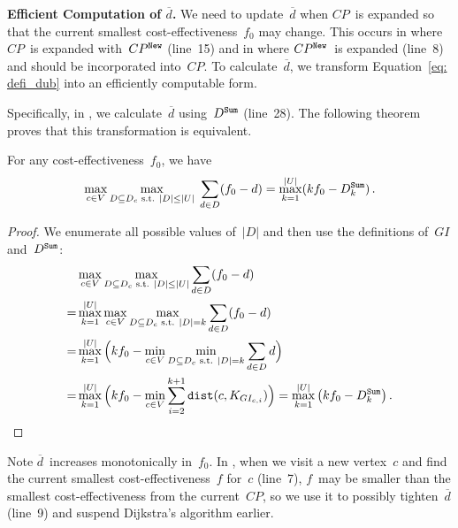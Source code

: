 \textbf{Efficient Computation of $\overline{d}$.}
We need to update~$\overline d$ when $CP$~is expanded so that the current smallest cost-effectiveness~$f_0$ may change. This occurs in \Improved where $CP$~is expanded with~$CP^{\mathtt{New}}$ (line~15) and in \PartialDijkstra where $CP^{\mathtt{New}}$~is expanded (line~8) and should be incorporated into~$CP$. To calculate~$\overline d$, we transform Equation~\eqref{eq: defi_dub} into an efficiently computable form.

Specifically, in \Improved, we calculate~$\overline{d}$ using~$D^{\texttt{Sum}}$ (line~28). The following theorem proves that this transformation is equivalent.

\begin{theorem}
\label{the: msd2dub}
    For any cost-effectiveness~$f_0$, we have
    \begin{gather}
    \label{eq: calc_dub}
        \max_{c\in V}\max_{D \subseteq D_{c} \text{ s.t. } |D|\leq |U|}\; \sum_{d\in D}(f_0-d)=\max_{k=1}^{|U|}(kf_0-D^{\texttt{Sum}}_{k}) \,.
    \end{gather}
\end{theorem}
\begin{proof}
    We enumerate all possible values of~$|D|$ and then use the definitions of~$GI$ and~$D^{\texttt{Sum}}$:
    \begin{gather}
    \label{eq: dub_fin_1}
    \begin{aligned}
    &\max_{c\in V}\max_{D \subseteq D_{c} \text{ s.t. } |D|\leq |U|} \sum_{d\in D}(f_0-d)\\
    =&\max_{k=1}^{|U|}\max_{c\in V}\max_{D \subseteq D_{c}\text{ s.t. } |D|=k} \sum_{d\in D}(f_0-d)\\
    =&\max_{k=1}^{|U|} \Big(kf_0-\min_{c\in V}\min_{D \subseteq D_{c}\text{ s.t. } |D|=k}{\sum_{d\in D}d}\Big)\\
    =&\max_{k=1}^{|U|} \Big(kf_0-\min_{c\in V}\sum_{i=2}^{k+1}\mathtt{dist}(c,K_{GI_{c,i}})\Big)
    =\max_{k=1}^{|U|} \big(kf_0-D^{\texttt{Sum}}_{k}\big) \,.
    \end{aligned}
    \end{gather}
\end{proof}

Note $\overline{d}$~increases monotonically in~$f_0$. In \PartialDijkstra, when we visit a new vertex~$c$ and find the current smallest cost-effectiveness~$f$ for~$c$ (line~7), $f$~may be smaller than the smallest cost-effectiveness from the current~$CP$, so we use it to possibly tighten~$\overline{d}$ (line~9) and suspend Dijkstra's algorithm earlier.

